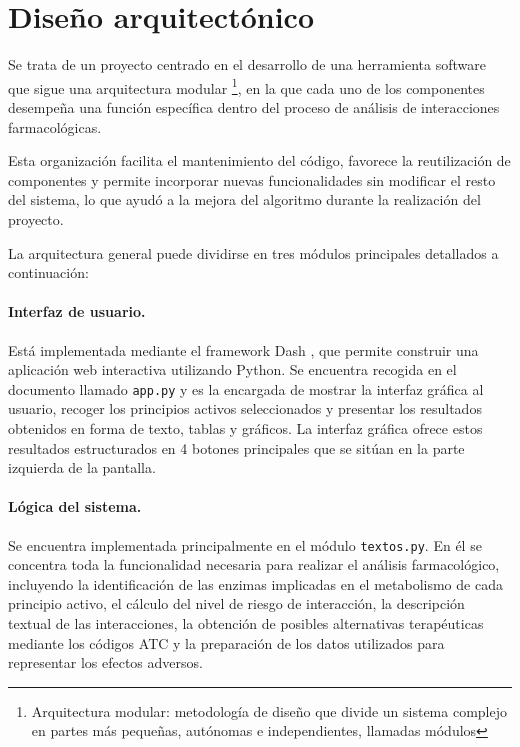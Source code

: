 
\section{Diseño arquitectónico}
Se trata de un proyecto centrado en el desarrollo de una herramienta software que sigue una arquitectura modular \footnote{Arquitectura modular: metodología de diseño que divide un sistema complejo en partes más pequeñas, autónomas e independientes, llamadas módulos}, 
en la que cada uno de los componentes desempeña una función específica dentro del proceso de análisis de interacciones farmacológicas.

Esta organización facilita el mantenimiento del código, favorece la reutilización de componentes y permite incorporar nuevas funcionalidades sin modificar el resto del sistema, lo que ayudó a la mejora del algoritmo durante la realización del proyecto.

La arquitectura general puede dividirse en tres módulos principales detallados a continuación:
\paragraph{Interfaz de usuario.} Está implementada mediante el framework Dash \cite{dash_framework}, que permite construir una aplicación web interactiva utilizando 
Python. Se encuentra recogida en el documento llamado \texttt{app.py} y es la encargada de mostrar la interfaz gráfica al usuario, recoger 
los principios activos seleccionados y presentar los resultados obtenidos en forma de texto, tablas y gráficos.
La interfaz gráfica ofrece estos resultados estructurados en 4 botones principales que se sitúan en la parte izquierda de la pantalla. 
\paragraph{Lógica del sistema.} Se encuentra implementada principalmente en el módulo \texttt{textos.py}. 
En él se concentra toda la funcionalidad necesaria para realizar el análisis farmacológico, incluyendo la identificación de las enzimas 
implicadas en el metabolismo de cada principio activo, el cálculo del nivel de riesgo de interacción, la descripción textual de las 
interacciones, la obtención de posibles alternativas terapéuticas mediante los códigos ATC y la preparación de los datos utilizados 
para representar los efectos adversos.
